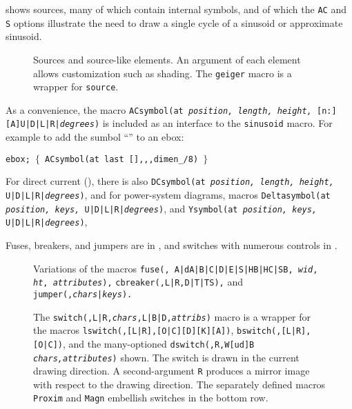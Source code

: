  shows sources, many of which contain internal symbols,
and of which the {\tt AC} and {\tt S} options illustrate the need
to draw a single cycle of a sinusoid or approximate sinusoid.
\begin{figure}[hbt]
   
   \caption{Sources and source-like elements. An argument of each
      element allows customization such as shading. The {\tt geiger}
      macro is a wrapper for {\tt source}.}
   \label{Sources}
   \end{figure}
As a convenience,
the macro {\tt ACsymbol(at {\sl position, length, height,}
  [n:][A]U|D|L|R|{\sl degrees})} is included as an interface to
the {\tt sinusoid} macro.  For example to add the sumbol
``'' to an ebox:
\par
{\tt ebox; $\lbrace$\ ACsymbol(at last [],{,},dimen\_/8) $\rbrace$}

\noindent
For direct current (), there is also
{\tt DCsymbol(at {\sl position, length, height,} U|D|L|R|{\sl degrees})},
and for power-system diagrams, macros
{\tt Deltasymbol(at {\sl position, keys,} U|D|L|R|{\sl degrees})},
and
{\tt Ysymbol(at {\sl position, keys,} U|D|L|R|{\sl degrees})},

Fuses, breakers, and jumpers are in ,
and switches with numerous controls in .
\begin{figure}[hbt]
   
   \caption{Variations of the macros
     {\tt fuse(\linespec, A|dA|B|C|D|E|S|HB|HC|SB, {\sl wid}, {\sl ht},
       {\sl attributes}),}
     {\tt cbreaker(\linespec,L|R,D|T|TS),}
     and 
     {\tt jumper(\linespec,{\sl chars}|{\sl keys}).}}
   \label{Fuses}
   \end{figure}
\begin{figure}[hbt]
   
   \caption{The
     {\tt switch(\linespec,L|R,{\sl chars},L|B|D,{\sl attribs})}
     macro is a wrapper for the macros 
     {\tt lswitch(\linespec,[L|R],[O|C][D][K][A])},
     {\tt bswitch(\linespec,[L|R],[O|C])},
     and the many-optioned
     {\tt dswitch(\linespec,R,W[ud]B {\sl chars,attributes})} shown.
     The switch is drawn in the current drawing direction.
     A second-argument {\tt R} produces a mirror
     image with respect to the drawing direction.
     The separately defined macros {\tt Proxim} and {\tt Magn}
     embellish switches in the bottom row.}
   \label{Switches}
   \end{figure}

